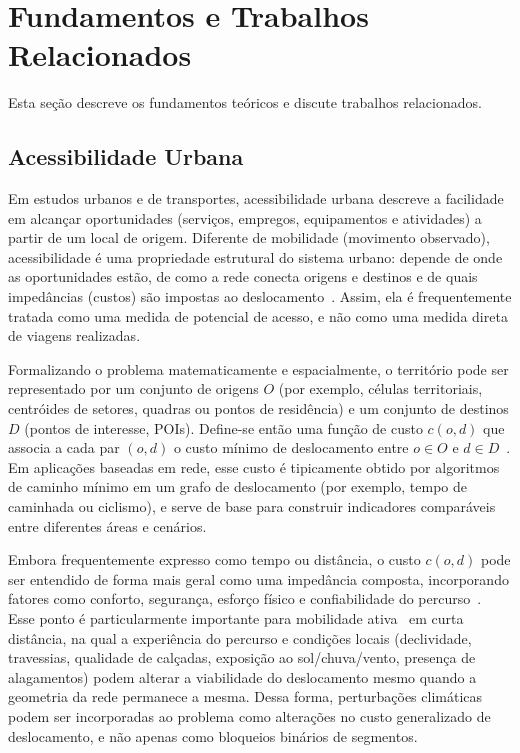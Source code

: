 \section{Fundamentos e Trabalhos Relacionados}
Esta seção descreve os fundamentos teóricos e discute trabalhos
relacionados.

\subsection{Acessibilidade Urbana}

Em estudos urbanos e de transportes, acessibilidade urbana descreve a facilidade em alcançar oportunidades (serviços, empregos, equipamentos e atividades) a partir de um local de origem. Diferente de mobilidade (movimento observado), acessibilidade é uma propriedade estrutural do sistema urbano: depende de onde as oportunidades estão, de como a rede conecta origens e destinos e de quais impedâncias (custos) são impostas ao deslocamento~\cite{Handy1997Measuring}. Assim, ela é frequentemente tratada como uma medida de potencial de acesso, e não como uma medida direta de viagens realizadas.

Formalizando o problema matematicamente e espacialmente, o território pode ser representado por um conjunto de origens $O$ (por exemplo, células territoriais, centróides de setores, quadras ou pontos de residência) e um conjunto de destinos $D$ (pontos de interesse, POIs). Define-se então uma função de custo $c(o,d)$ que associa a cada par $(o,d)$ o custo mínimo de deslocamento entre $o \in O$ e $d \in D$~\cite{Miller1999Measuring}. Em aplicações baseadas em rede, esse custo é tipicamente obtido por algoritmos de caminho mínimo em um grafo de deslocamento (por exemplo, tempo de caminhada ou ciclismo), e serve de base para construir indicadores comparáveis entre diferentes áreas e cenários.

Embora frequentemente expresso como tempo ou distância, o custo $c(o,d)$ pode ser entendido de forma mais geral como uma impedância composta, incorporando fatores como conforto, segurança, esforço físico e confiabilidade do percurso~\cite{Puello2016Integration}. Esse ponto é particularmente importante para mobilidade ativa~\cite{Cook2022More} em curta distância, na qual a experiência do percurso e condições locais (declividade, travessias, qualidade de calçadas, exposição ao sol/chuva/vento, presença de alagamentos) podem alterar a viabilidade do deslocamento mesmo quando a geometria da rede permanece a mesma. Dessa forma, perturbações climáticas podem ser incorporadas ao problema como alterações no custo generalizado de deslocamento, e não apenas como bloqueios binários de segmentos.

